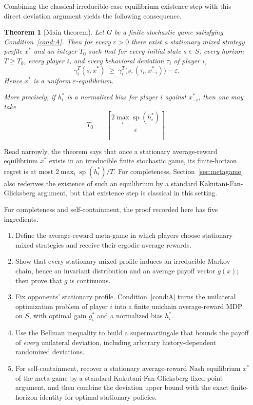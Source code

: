 \documentclass[11pt]{article}
\newtheorem{theorem}{Theorem}[section]
\theoremstyle{definition}
\newcommand{\1}{\mathbf{1}}
\DeclareMathOperator{\spn}{sp}
\begin{document}
Combining the classical irreducible-case equilibrium existence step with this direct deviation argument yields the following consequence.

\begin{theorem}[Main theorem]\label{thm:intro-main}
Let $G$ be a finite stochastic game satisfying Condition~\ref{cond:A}. Then for every $\varepsilon>0$ there exist a stationary mixed strategy profile $x^*$ and an integer $T_0$ such that for every initial state $s\in S$, every horizon $T\ge T_0$, every player $i$, and every behavioral deviation $\tau_i$ of player $i$,
\[
\gamma_i^T(s,x^*)\;\ge\;\gamma_i^T\bigl(s,(\tau_i,x^*_{-i})\bigr)-\varepsilon.
\]
Hence $x^*$ is a uniform $\varepsilon$-equilibrium.

More precisely, if $h_i^*$ is a normalized bias for player $i$ against $x^*_{-i}$, then one may take
\[
T_0\;=\;\left\lceil \frac{2\max_{i}\spn(h_i^*)}{\varepsilon}\right\rceil.
\]
\end{theorem}

Read narrowly, the theorem says that once a stationary average-reward equilibrium $x^*$ exists in an irreducible finite stochastic game, its finite-horizon regret is at most $2\max_i \spn(h_i^*)/T$. For completeness, Section~\ref{sec:metagame} also rederives the existence of such an equilibrium by a standard Kakutani-Fan-Glicksberg argument, but that existence step is classical in this setting.

For completeness and self-containment, the proof recorded here has five ingredients.
\begin{enumerate}[label=\textup{(\arabic*)},leftmargin=2.8em]
\item Define the average-reward meta-game in which players choose stationary mixed strategies and receive their ergodic average rewards.
\item Show that every stationary mixed profile induces an irreducible Markov chain, hence an invariant distribution and an average payoff vector $g(x)$; then prove that $g$ is continuous.
\item Fix opponents' stationary profile. Condition~\ref{cond:A} turns the unilateral optimization problem of player $i$ into a finite unichain average-reward MDP on $S$, with optimal gain $g_i^*$ and a normalized bias $h_i^*$.
\item Use the Bellman inequality to build a supermartingale that bounds the payoff of \emph{every} unilateral deviation, including arbitrary history-dependent randomized deviations.
\item For self-containment, recover a stationary average-reward Nash equilibrium $x^*$ of the meta-game by a standard Kakutani-Fan-Glicksberg fixed-point argument, and then combine the deviation upper bound with the exact finite-horizon identity for optimal stationary policies.
\end{enumerate}
\end{document}
